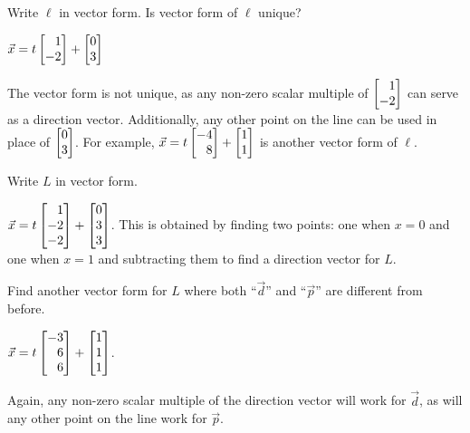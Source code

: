 	\begin{parts}
		\item Write $\ell$ in vector form. Is vector form of $\ell$ unique?
			\begin{solution}
				$\vec x = t \mat{1 \\ -2} + \mat{0 \\ 3}$

				The vector form is not unique, as any non-zero scalar multiple of
				$\mat{1 \\ -2}$ can serve as a direction vector. Additionally,
				any other point on the line can be used in place of
				$\mat{0 \\3}$. For example,  $\vec x = t \mat{-4 \\ 8} + \mat{1 \\ 1}$
				is another vector form of $\ell$.
			\end{solution}
		\item Write $L$ in vector form.
			\begin{solution}[inline]
				$\vec x = t\mat{1 \\ -2 \\ -2} + \mat{0 \\ 3 \\ 3}$. This is obtained
				by finding two points: one when $x=0$ and one when $x=1$ and subtracting
				them to find a direction vector for $L$.
			\end{solution}
		\item Find another vector form for $L$ where both ``$\vec d$'' and
			``$\vec p$'' are different from before.
			\begin{solution}
				$\vec x = t \mat{-3 \\ 6 \\ 6} + \mat{1 \\ 1 \\ 1}$.

				Again, any non-zero scalar multiple of the direction vector
				will work for $\vec d$, as will any other point on the line
				work for $\vec p$.
			\end{solution}
	\end{parts}

